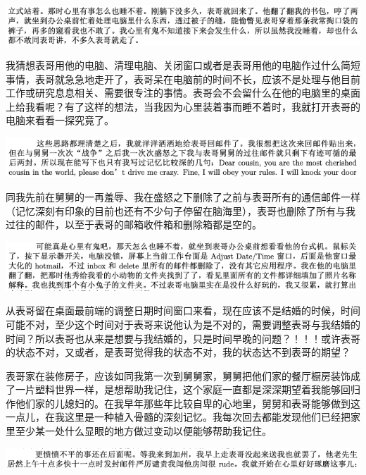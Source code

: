 \documentclass[9pt, b5paper]{article}
\begin{document}
\begin{center}
\includegraphics[width=.9\linewidth]{./pic/p1p67-0.png}
\end{center}

我猜想表哥用他的电脑、清理电脑、关闭窗口或者是表哥用他的电脑作过什么简短事情，表哥就急急地走开了，表哥呆在电脑前的时间不长，应该不是处理与他目前工作或研究息息相关、需要很专注的事情。表哥会不会留什么在他的电脑里的桌面上给我看呢？有了这样的想法，当我因为心里装着事而睡不着时，我就打开表哥的电脑来看看一探究竟了。 

\begin{center}
\includegraphics[width=.9\linewidth]{./pic/p1p55-3.png}
\end{center}

同我先前在舅舅的一再羞辱、我在盛怒之下删除了之前与表哥所有的通信邮件一样（记忆深刻有印象的目前也还有不少句子停留在脑海里），表哥也删除了所有与我过往的邮件，以至于表哥的邮箱收件箱和删除箱都是空的。 

\begin{center}
\includegraphics[width=.9\linewidth]{./pic/p1p67-8.png}
\end{center}

从表哥留在桌面最前端的调整日期时间窗口来看，现在应该不是结婚的时候，时间可能不对，至少这个时间对于表哥来说他认为是不对的，需要调整表哥与我结婚的时间？所以表哥也从来是想要与我结婚的，只是时间早晚的问题？！！！或许表哥的状态不对，又或者，是表哥觉得我的状态不对，我的状态达不到表哥的期望？

表哥家在装修房子，应该如同我第一次到舅舅家，舅舅把他们家的餐厅橱房装饰成了一片塑料世界一样，是想帮助我记住，这个家庭一直都是深深期望着我能够回归作他们家的儿媳妇的。在我早年那些年比较自卑的心地里，舅舅和表哥能够做到这一点儿，在我这里是一种植入骨髓的深刻记忆。我每次回去都能发现他们已经把家里至少某一处什么显眼的地方做过变动以便能够帮助我记住。

\begin{center}
\includegraphics[width=.9\linewidth]{./pic/p1p54-3.png}
\end{center}
\end{document}
